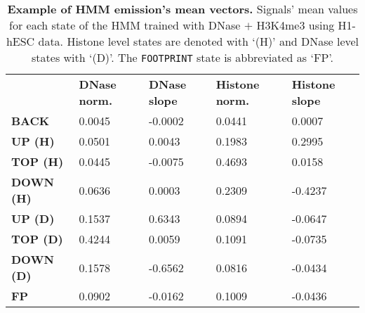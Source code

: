 \begin{table}[t]
\footnotesize
\begin{center}
\caption[Example of HMM emission's mean vectors]{\textbf{Example of HMM emission's mean vectors.} Signals' mean values for each state of the HMM trained with DNase $+$ H3K4me3 using H1-hESC data. Histone level states are denoted with `(H)' and DNase level states with `(D)'. The {\tt FOOTPRINT} state is abbreviated as `FP'.}
\label{tab:hmmmean}
    \renewcommand{\arraystretch}{1.2}
    \begin{tabular}{ lllll }
        \hline
        & \textbf{DNase norm.} & \textbf{DNase slope} & \textbf{Histone norm.} & \textbf{Histone slope} \\
        \textbf{BACK}     & 0.0045 & -0.0002 & 0.0441 & 0.0007  \\
        \textbf{UP (H)}   & 0.0501 & 0.0043  & 0.1983 & 0.2995  \\
        \textbf{TOP (H)}  & 0.0445 & -0.0075 & 0.4693 & 0.0158  \\
        \textbf{DOWN (H)} & 0.0636 & 0.0003  & 0.2309 & -0.4237 \\
        \textbf{UP (D)}   & 0.1537 & 0.6343  & 0.0894 & -0.0647 \\
        \textbf{TOP (D)}  & 0.4244 & 0.0059  & 0.1091 & -0.0735 \\
        \textbf{DOWN (D)} & 0.1578 & -0.6562 & 0.0816 & -0.0434 \\
        \textbf{FP}       & 0.0902 & -0.0162 & 0.1009 & -0.0436 \\
        \hline
    \end{tabular}
\end{center}
\end{table}



